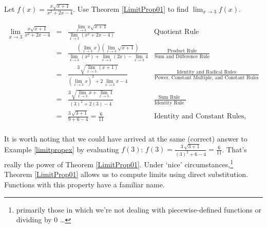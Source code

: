 \documentclass{ximera}
\begin{document}
\begin{example} \label{limitpropex} Let $f(x)=  \frac{ x \sqrt{x+1}}{x^2+2x-4}$.  Use Theorem \ref{LimitProp01} to find $\lim_{x \rightarrow 3} f(x)$.




\begin{explanation}

\[ \begin{array}{rclr}

\lim_{x \rightarrow 3} \frac{ x \sqrt{x+1}}{x^2+2x-4} & = &  \frac{\lim_{x \rightarrow 3} x \sqrt{x+1} }{\lim_{x \rightarrow 3} \left(x^2+2x-4\right)} & \text{Quotient Rule }  \\ 

& = &  \frac{ \left( \lim_{x \rightarrow 3} x \right) \left(  \lim_{x \rightarrow 3} \sqrt{x+1} \right) }{\lim_{x \rightarrow 3} \left( x^2 \right) +\lim_{x \rightarrow 3} ( 2x ) - \lim_{x \rightarrow 3} 4 }  & \frac{\text{Product Rule}}{\text{Sum and Difference Rule}}  \\ 

 & = &  \frac{ 3   \, \sqrt{ \lim_{x \rightarrow 3} (x+1) } }{ \left( \lim_{x \rightarrow 3}  x \right)^2  +2 \, \lim_{x \rightarrow 3} x  -4 } & \frac{\text{Identity and Radical Rules}}{\text{Power, Constant Multiple, and Constant Rules}}  \\ 

 & = &  \frac{ 3   \, \sqrt{ \lim_{x \rightarrow 3} x+\lim_{x \rightarrow 3} 1  } }{ (3)^2  +2 (3)   -4 }  & \frac{\text{Sum Rule }}{\text{Identity Rule }}  \\ 

 & = &   \frac{ 3   \, \sqrt{ 3+ 1  } }{ 9+6   -4 } = \frac{6}{11}   & \text{Identity and Constant Rules, Simplify}  \\ 

\end{array} \] 
\end{explanation}

\end{example}

It is worth noting that we could have arrived at the same (correct) answer to Example \ref{limitpropex} by evaluating $f(3)$:  $f(3) = \frac{ 3   \, \sqrt{ 3+ 1  } }{ (3)^2+6   -4 } = \frac{6}{11}$.  That's really the power of Theorem \ref{LimitProp01}.  Under `nice' circumstances,\footnote{primarily those in which we're not dealing with piecewise-defined functions or dividing by $0$ \ldots}  Theorem \ref{LimitProp01} allows us to compute limits using direct substitution.  Functions with this property have a  familiar name.
\end{document}
